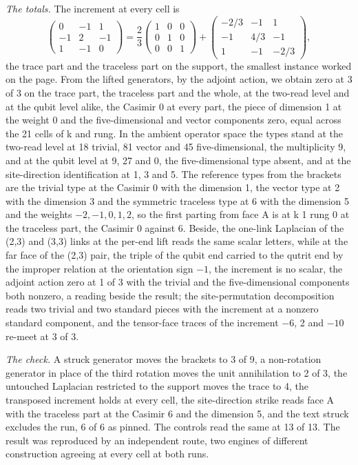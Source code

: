 \begin{chproof}
\textit{The totals.} The increment at every cell is
\begin{equation}
\begin{pmatrix} 0 & -1 & 1 \\ -1 & 2 & -1 \\ 1 & -1 & 0 \end{pmatrix}
= \frac{2}{3}\begin{pmatrix} 1 & 0 & 0 \\ 0 & 1 & 0 \\ 0 & 0 & 1 \end{pmatrix}
+ \begin{pmatrix} -2/3 & -1 & 1 \\ -1 & 4/3 & -1 \\ 1 & -1 & -2/3 \end{pmatrix},
\end{equation}
the trace part and the traceless part on the support, the smallest instance worked on the page. From the lifted generators, by the adjoint action, we obtain zero at 3 of 3 on the trace part, the traceless part and the whole, at the two-read level and at the qubit level alike, the Casimir 0 at every part, the piece of dimension 1 at the weight 0 and the five-dimensional and vector components zero, equal across the 21 cells of k and rung. In the ambient operator space the types stand at the two-read level at 18 trivial, 81 vector and 45 five-dimensional, the multiplicity 9, and at the qubit level at 9, 27 and 0, the five-dimensional type absent, and at the site-direction identification at 1, 3 and 5. The reference types from the brackets are the trivial type at the Casimir 0 with the dimension 1, the vector type at 2 with the dimension 3 and the symmetric traceless type at 6 with the dimension 5 and the weights $-2, -1, 0, 1, 2$, so the first parting from face A is at k 1 rung 0 at the traceless part, the Casimir 0 against 6. Beside, the one-link Laplacian of the (2,3) and (3,3) links at the per-end lift reads the same scalar letters, while at the far face of the (2,3) pair, the triple of the qubit end carried to the qutrit end by the improper relation at the orientation sign $-1$, the increment is no scalar, the adjoint action zero at 1 of 3 with the trivial and the five-dimensional components both nonzero, a reading beside the result; the site-permutation decomposition reads two trivial and two standard pieces with the increment at a nonzero standard component, and the tensor-face traces of the increment $-6$, 2 and $-10$ re-meet at 3 of 3.

\textit{The check.} A struck generator moves the brackets to 3 of 9, a non-rotation generator in place of the third rotation moves the unit annihilation to 2 of 3, the untouched Laplacian restricted to the support moves the trace to 4, the transposed increment holds at every cell, the site-direction strike reads face A with the traceless part at the Casimir 6 and the dimension 5, and the text struck excludes the run, 6 of 6 as pinned. The controls read the same at 13 of 13. The result was reproduced by an independent route, two engines of different construction agreeing at every cell at both runs.
\end{chproof}
